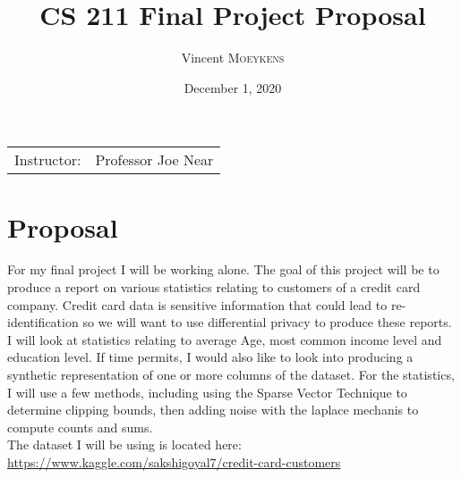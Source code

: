 \documentclass{article}
\title{CS 211 Final Project Proposal}
\author{Vincent \textsc{Moeykens}}
\date{December 1, 2020}
\begin{document}
\maketitle

\begin{center}
\begin{tabular}{l r}
Instructor: & Professor Joe Near
\end{tabular}
\end{center}


\section{Proposal}
For my final project I will be working alone. The goal of this project will be to produce a report on various statistics relating to customers of a credit card company. Credit card data is sensitive information that could lead to re-identification so we will want to use differential privacy to produce these reports. I will look at statistics relating to average Age, most common income level and education level. If time permits, I would also like to look into producing a synthetic representation of one or more columns of the dataset. For the statistics, I will use a few methods, including using the Sparse Vector Technique to determine clipping bounds, then adding noise with the laplace mechanis to compute counts and sums. \\

The dataset I will be using is located here: \href{https://www.kaggle.com/sakshigoyal7/credit-card-customers}{https://www.kaggle.com/sakshigoyal7/credit-card-customers}
\end{document}
